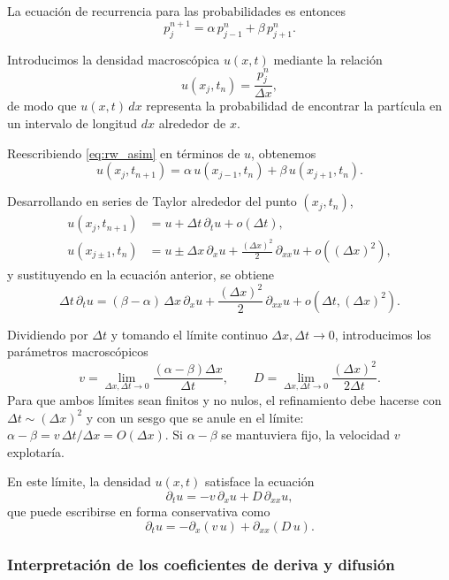 \documentclass[12pt, a4paper]{amsbook}
\theoremstyle{remark}
\theoremstyle{definition}
\numberwithin{section}{chapter}
\numberwithin{subsection}{section}
\numberwithin{equation}{section}
\numberwithin{figure}{chapter}
\begin{document}
La ecuación de recurrencia para las probabilidades es entonces
\begin{equation}
p_j^{n+1} = \alpha\, p_{j-1}^n + \beta\, p_{j+1}^n.
\label{eq:rw_asim}
\end{equation}

Introducimos la densidad macroscópica $u(x,t)$ mediante la relación
$$
u(x_j,t_n) = \frac{p_j^n}{\Delta x},
$$
de modo que $u(x,t)\,dx$ representa la probabilidad de encontrar la partícula en un intervalo de longitud $dx$ alrededor de $x$.

Reescribiendo \eqref{eq:rw_asim} en términos de $u$, obtenemos
$$
u(x_j,t_{n+1}) = \alpha\,u(x_{j-1},t_n) + \beta\,u(x_{j+1},t_n).
$$

Desarrollando en series de Taylor alrededor del punto $(x_j,t_n)$,
\begin{align*}
u(x_j,t_{n+1}) &= u + \Delta t\,\partial_t u + o(\Delta t), \\
u(x_{j\pm1},t_n) &= u \pm \Delta x\,\partial_x u + \frac{(\Delta x)^2}{2}\,\partial_{xx}u + o((\Delta x)^2),
\end{align*}
y sustituyendo en la ecuación anterior, se obtiene
$$
\Delta t\,\partial_t u = (\beta-\alpha)\,\Delta x\,\partial_x u + \frac{(\Delta x)^2}{2}\,\partial_{xx}u + o(\Delta t,(\Delta x)^2).
$$

Dividiendo por $\Delta t$ y tomando el límite continuo $\Delta x,\Delta t\to0$, introducimos los parámetros macroscópicos
$$
v = \lim_{\Delta x,\Delta t\to0} \frac{(\alpha-\beta)\Delta x}{\Delta t}, \qquad D = \lim_{\Delta x,\Delta t\to0} \frac{(\Delta x)^2}{2\Delta t}.
$$
Para que ambos límites sean finitos y no nulos, el refinamiento debe hacerse con $\Delta t\sim(\Delta x)^2$ y con un sesgo que se anule en el límite: $\alpha-\beta = v\,\Delta t/\Delta x = O(\Delta x)$. Si $\alpha-\beta$ se mantuviera fijo, la velocidad $v$ explotaría.

En este límite, la densidad $u(x,t)$ satisface la ecuación
\begin{equation}
\partial_t u = -v\,\partial_x u + D\,\partial_{xx}u,
\label{eq:fp_simple}
\end{equation}
que puede escribirse en forma conservativa como
$$
\partial_t u = -\partial_x(v\,u) + \partial_{xx}(D\,u).
$$

\subsubsection*{Interpretación de los coeficientes de deriva y difusión}
\end{document}
